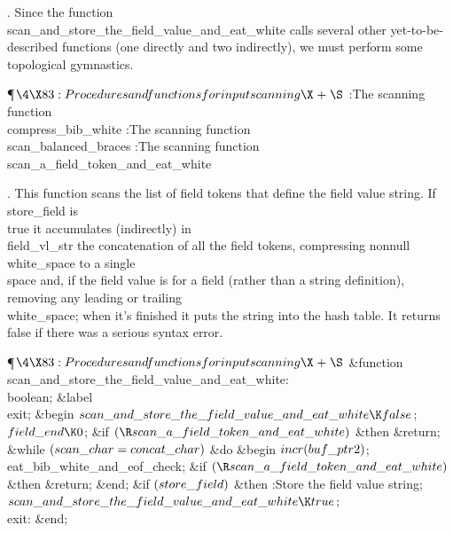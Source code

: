.
Since the function \\{scan\_and\_store\_the\_field\_value\_and\_eat\_white}
calls several other yet-to-be-described functions (one directly and
two indirectly), we must perform some topological gymnastics.

\Y\P$\4\X83:Procedures and functions for input scanning\X\mathrel{+}\S$\6
:The scanning function \\{compress\_bib\_white}\X\6
:The scanning function \\{scan\_balanced\_braces}\X\6
:The scanning function \\{scan\_a\_field\_token\_and\_eat\_white}\X\par
\fi

.
This function scans the list of field tokens that define the field
value string.  If \\{store\_field} is \\{true} it accumulates (indirectly)
in \\{field\_vl\_str} the concatenation of all the field tokens,
compressing nonnull \\{white\_space} to a single \\{space} and, if the
field value is for a field (rather than a string definition), removing
any leading or trailing \\{white\_space}; when it's finished it puts the
string into the hash table.  It returns \\{false} if there was a serious
syntax error.

\Y\P$\4\X83:Procedures and functions for input scanning\X\mathrel{+}\S$\6
\4\&{function}\1\  \\{scan\_and\_store\_the\_field\_value\_and\_eat\_white}:
\\{boolean};\6
\4\&{label} \\{exit};\2\6
\&{begin} $\\{scan\_and\_store\_the\_field\_value\_and\_eat\_white}\K%
\\{false}$;\6
$\\{field\_end}\K0$;\6
\&{if} $(\R\\{scan\_a\_field\_token\_and\_eat\_white})$ \1\&{then}\5
\&{return};\2\6
\&{while} $(\\{scan\_char}=\\{concat\_char})$ \1\&{do}\6
\&{begin} $\\{incr}(\\{buf\_ptr2})$;\6
\\{eat\_bib\_white\_and\_eof\_check};\6
\&{if} $(\R\\{scan\_a\_field\_token\_and\_eat\_white})$ \1\&{then}\5
\&{return};\2\6
\&{end};\2\6
\&{if} $(\\{store\_field})$ \1\&{then}\5
:Store the field value string\X;\2\6
$\\{scan\_and\_store\_the\_field\_value\_and\_eat\_white}\K\\{true}$;\6
\4\\{exit}: \&{end};\par
\fi

